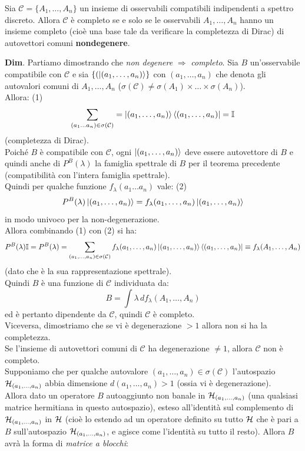 \documentclass[../../FisicaTeorica.tex]{subfiles}
\begin{document}
\begin{thm}
Sia $\mathcal{C}=\{A_1, \dots, A_n\}$ un insieme di osservabili compatibili indipendenti a spettro discreto. Allora $\mathcal{C}$ è completo se e solo se le osservabili $A_1, \dots, A_n$ hanno un insieme completo (cioè una base tale da verificare la completezza di Dirac) di autovettori comuni \textbf{nondegenere}.
\end{thm} 
\textbf{Dim}. Partiamo dimostrando che \textit{non degenere} $\Rightarrow$ \textit{completo}.         
Sia $B$ un'osservabile compatibile con $\mathcal{C}$ e sia $\{(\ket{(a_1,\dots, a_n)}\}$ con $(a_1, \dots, a_n)$ che denota gli autovalori comuni di $A_1, \dots, A_n$ ($\sigma(\mathcal{C})\neq \sigma(A_1)\times \dots \times \sigma(A_n)$).\\
Allora: (1)
\[
\sum_{(a_1 \dots a_n)\in \sigma(\mathcal{C})}= \ket{(a_1, \dots, a_n)}\bra{(a_1, \dots, a_n)}=\mathbb{I}
\]
(completezza di Dirac).\\
Poiché $B$ è compatibile con $\mathcal{C}$, ogni $\ket{(a_1, \dots, a_n)}$ deve essere autovettore di $B$ e quindi anche di $P^B(\lambda)$ la famiglia spettrale di $B$ per il teorema precedente (compatibilità con l'intera famiglia spettrale).\\
Quindi per qualche funzione $f_\lambda(a_1\dots a_n)$ vale: (2)
\[
P^B(\lambda)\ket{(a_1, \dots, a_n)}=f_\lambda(a_1, \dots, a_n) \ket{(a_1, \dots, a_n)}
\]
in modo univoco per la non-degenerazione.\\
Allora combinando (1) con (2) si ha:
\[
P^B(\lambda)\mathbb{I} = P^B(\lambda)=\sum_{(a_1, \dots, a_n)\in \sigma(\mathcal{C})} f_\lambda(a_1, \dots, a_n)\ket{(a_1, \dots, a_n)}\bra{(a_1, \dots, a_n)}\equiv f_\lambda(A_1,\dots, A_n)
\]
(dato che è la sua rappresentazione spettrale).\\
Quindi $B$ è una funzione di $\mathcal{C}$ individuata da:
\[
B=\int \lambda\,df_\lambda(A_1,\dots, A_n)
\]
ed è pertanto dipendente da $\mathcal{C}$, quindi $\mathcal{C}$ è completo.\\
Viceversa, dimostriamo che se vi è degenerazione $>1$ allora non si ha la completezza.\\
Se l'insieme di autovettori comuni di $\mathcal{C}$ ha degenerazione $\neq 1$, allora $\mathcal{C}$ non è completo.\\
Supponiamo che per qualche autovalore $(a_1, \dots, a_n) \in \sigma(\mathcal{C})$ l'autospazio $\mathcal{H}_{(a_1,\dots,a_n)}$ abbia dimensione $d(a_1, \dots, a_n)>1$ (ossia vi è degenerazione).\\
Allora dato un operatore $B$ autoaggiunto non banale in $\mathcal{H}_{(a_1,\dots, a_n)}$ (una qualsiasi matrice hermitiana in questo autospazio), esteso all'identità sul complemento di $\mathcal{H}_{(a_1,\dots, a_n)}$ in $\mathcal{H}$ (cioè lo estendo ad un operatore definito su tutto $\mathcal{H}$ che è pari a $B$ sull'autospazio $\mathcal{H}_{(a_1, \dots, a_n)}$, e agisce come l'identità su tutto il resto). Allora $B$ avrà la forma di \textit{matrice a blocchi}:
\end{document}
